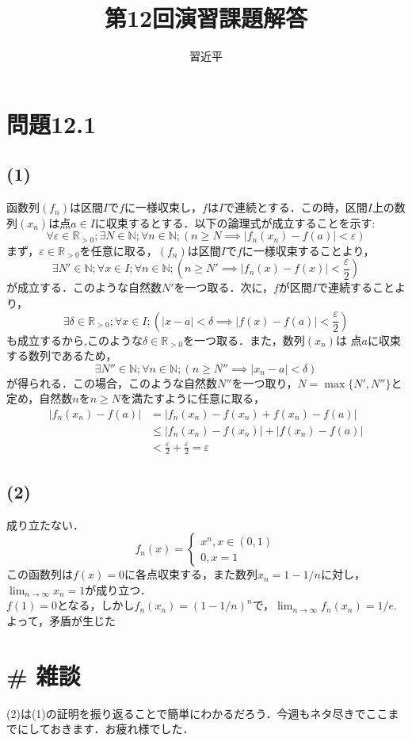 \documentclass{jreport}
\newcommand{\Rp}{\mathbb{R}_{>0}}
\newcommand{\N}{\mathbb{N}}
\begin{document}
\title{第12回演習課題解答}
\author{習近平}
\maketitle
\newpage
\tableofcontents
\newpage
\setcounter{chapter}{12}
\section{問題12.1}
\subsection{(1)}
函数列$(f_n)$は区間$I$で$f$に一様収束し，$f$は$I$で連続とする．この時，区間$I$上の数列$(x_n)$は点$a \in I$に収束するとする．以下の論理式が成立することを示す:
$$
\forall \varepsilon \in \Rp; \exists N \in \N; \forall n \in \N;\left( n\ge N \implies \left|f_n(x_n)-f(a) \right| < \varepsilon \right)
$$
まず，$\varepsilon \in \Rp$を任意に取る，$(f_n)$は区間$I$で$f$に一様収束することより，
$$
\exists N' \in \N;\forall x \in I; \forall n \in \N;\left( n\ge N' \implies \left| f_n(x) - f(x) \right| <\frac{\varepsilon}{2} \right)
$$
が成立する．このような自然数$N'$を一つ取る．次に，$f$が区間$I$で連続することより，
$$
\exists \delta \in \Rp; \forall x \in I; \left( |x-a|<\delta \implies |f(x) -f(a)|<\frac{\varepsilon}{2} \right)
$$
も成立するから,このような$\delta \in \Rp$を一つ取る．また，数列$(x_n)$は 点$a $に収束する数列であるため，
$$
\exists N'' \in \N; \forall n \in \N; \left( n\ge N'' \implies |x_n - a|<\delta \right)
$$
が得られる．この場合，このような自然数$N''$を一つ取り，$N = \max\{ N',N''\}$と定め，自然数$n$を$n\ge N$を満たすように任意に取る，
\begin{equation}
\begin{aligned}
	|f_n(x_n) -f(a)|&=|f_n(x_n) - f(x_n) +f(x_n) -f(a) |\\
			& \le |f_n(x_n) -f(x_n)| + |f(x_n) - f(a)| \\
			&<\frac{\varepsilon}{2} +\frac{\varepsilon}{2} =\varepsilon
\end{aligned}
\end{equation}
\newpage
\subsection{(2)}
成り立たない．
$$
f_n(x)=\begin{cases}
	x^n , x\in (0,1)\\
	0,x=1
	\end{cases}
$$
この函数列は$f(x)=0$に各点収束する，また数列$x_n=1-1/n$に対し，$\lim_{n\to \infty}x_n =1$が成り立つ．\\
$f(1)=0$となる，しかし$f_n(x_n)=(1-1/n)^{n}$で，$\lim_{n\to\infty}f_n(x_n)=1/e$.よって，矛盾が生じた\\
\newpage
\section{\# 雑談}
(2)は(1)の証明を振り返ることで簡単にわかるだろう．今週もネタ尽きでここまでにしておきます．お疲れ様でした．
\end{document}
